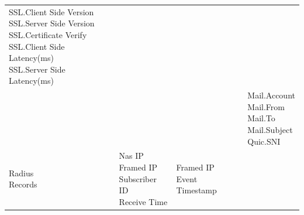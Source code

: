 \begin{description}
\begin{longtable}{p{}|p{}|p{}|p{}}
{                                                                                                                            SSL.Client Side Version\\
                                                                                                                            SSL.Server Side Version\\
                                                                                                                            SSL.Certificate Verify\\
                                                                                                                            SSL.Client Side Latency(ms)\\
                                                                                                                            SSL.Server Side Latency(ms)} \\\arrayrulecolor{white} \hline 
                                                         &                             &                        &     \tabincell{l}{
                                                                                                                                    Mail.Account\\
                                                                                                                                    Mail.From\\
                                                                                                                                    Mail.To\\
                                                                                                                                    Mail.Subject\\
                                                                                                                                    Quic.SNI}  \\ \arrayrulecolor{black} \hline 
        \tabincell{l}{Radius\\ Records} & \tabincell{l}{Nas IP\\
                                                    Framed IP\\
                                                    Subscriber ID\\
                                                    Receive Time}  & \tabincell{l}{Framed IP\\
                                                                                    Event Timestamp\\
}
\end{longtable}
\end{description}
